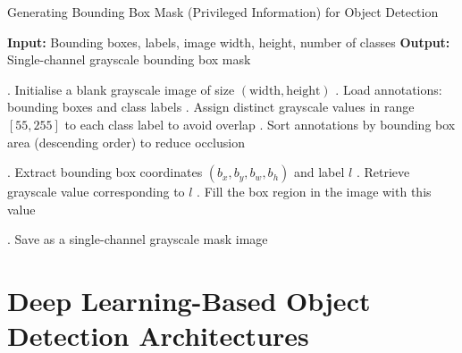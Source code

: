         
\begin{algorithm}
    \caption{Generating Bounding Box Mask (Privileged Information) for Object Detection}
    \label{alg:boundingBoxMask}
    \begin{algorithmic}
        \State \textbf{Input:} Bounding boxes, labels, image width, height, number of classes
        \State \textbf{Output:} Single-channel grayscale bounding box mask
        
        . Initialise a blank grayscale image of size \( (\text{width}, \text{height}) \)
        . Load annotations: bounding boxes and class labels
        . Assign distinct grayscale values in range $[55, 255]$ to each class label to avoid overlap
        . Sort annotations by bounding box area (descending order) to reduce occlusion
        
            . Extract bounding box coordinates \( (b_x, b_y, b_w, b_h) \) and label \( l \)
            . Retrieve grayscale value corresponding to \( l \)
            . Fill the box region in the image with this value
        \EndFor
        
        . Save as a single-channel grayscale mask image
    \end{algorithmic}
\end{algorithm}


\section{Deep Learning-Based Object Detection Architectures}
\label{sec:4_distillation_architectures}


